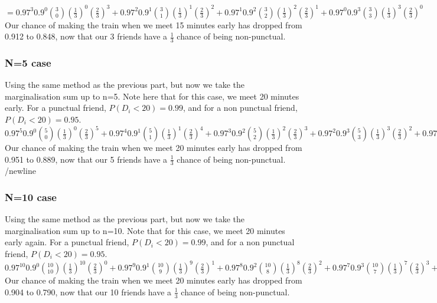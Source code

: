 \documentclass{article}
\begin{document}
\vspace{5mm}
\noindent
$=0.97^3 0.9^0 {3 \choose 0}(\frac{1}{3})^0 (\frac{2}{3})^3
+0.97^2 0.9^1 {3 \choose 1}(\frac{1}{3})^1 (\frac{2}{3})^2
+0.97^1 0.9^2 {3 \choose 2}(\frac{1}{3})^2 (\frac{2}{3})^1
+0.97^0 0.9^3 {3 \choose 3}(\frac{1}{3})^3 (\frac{2}{3})^0$
\newline
\noindent
Our chance of making the train when we meet 15 minutes early has dropped from 0.912 to 0.848, now that our 3 friends have a $\frac{1}{3}$ chance of being non-punctual.
\newline

\subsubsection{N=5 case}
Using the same method as the previous part, but now we take the marginalisation sum up to n=5. Note here that for this case, we meet 20 minutes early. For a punctual friend, $P(D_i<20)=0.99$, and for a non punctual friend, $P(D_i<20)=0.95$. 
\newline
\noindent
$0.97^5 0.9^0 {5 \choose 0}(\frac{1}{3})^0 (\frac{2}{3})^5
+0.97^4 0.9^1 {5 \choose 1}(\frac{1}{3})^1 (\frac{2}{3})^4
+0.97^3 0.9^2 {5 \choose 2}(\frac{1}{3})^2 (\frac{2}{3})^3
+0.97^2 0.9^3 {5 \choose 3}(\frac{1}{3})^3 (\frac{2}{3})^2
+0.97^1 0.9^4 {5 \choose 4}(\frac{1}{3})^4 (\frac{2}{3})^1
+0.97^0 0.9^5 {5 \choose 5}(\frac{1}{3})^5 (\frac{2}{3})^0$
\newline
{}
\newline
\noindent
Our chance of making the train when we meet 20 minutes early has dropped from 0.951 to 0.889, now that our 5 friends have a $\frac{1}{3}$ chance of being non-punctual.
/newline

\subsubsection{N=10 case}
Using the same method as the previous part, but now we take the marginalisation sum up to n=10. Note that for this case, we meet 20 minutes early again. For a punctual friend, $P(D_i<20)=0.99$, and for a non punctual friend, $P(D_i<20)=0.95$. 
\newline
\noindent
$0.97^{10} 0.9^0 {10 \choose 10}(\frac{1}{3})^{10} (\frac{2}{3})^0
+0.97^9 0.9^1 {10 \choose 9}(\frac{1}{3})^9 (\frac{2}{3})^1
+0.97^8 0.9^2 {10 \choose 8}(\frac{1}{3})^8 (\frac{2}{3})^2
+0.97^7 0.9^3 {10 \choose 7}(\frac{1}{3})^7 (\frac{2}{3})^3
+0.97^6 0.9^4 {10 \choose 6}(\frac{1}{3})^6 (\frac{2}{3})^4
+0.97^5 0.9^5 {10 \choose 5}(\frac{1}{3})^5 (\frac{2}{3})^5
+0.97^4 0.9^6 {10 \choose 4}(\frac{1}{3})^4 (\frac{2}{3})^6
+0.97^3 0.9^7 {10 \choose 3}(\frac{1}{3})^3 (\frac{2}{3})^7
+0.97^2 0.9^8 {10 \choose 2}(\frac{1}{3})^2 (\frac{2}{3})^8
+0.97^1 0.9^9 {10 \choose 1}(\frac{1}{3})^1 (\frac{2}{3})^9
+0.97^0 0.9^{10} {10 \choose 0}(\frac{1}{3})^0 (\frac{2}{3})^{10}$
\newline
{}
\newline
\noindent
Our chance of making the train when we meet 20 minutes early has dropped from 0.904 to 0.790, now that our 10 friends have a $\frac{1}{3}$ chance of being non-punctual.
\end{document}
